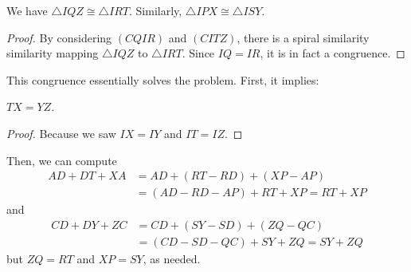 \begin{claim*}
  We have $\triangle IQZ \cong \triangle IRT$.
  Similarly, $\triangle IPX \cong \triangle ISY$.
\end{claim*}
\begin{proof}
  By considering $(CQIR)$ and $(CITZ)$,
  there is a spiral similarity similarity
  mapping $\triangle IQZ$ to $\triangle IRT$.
  Since $IQ = IR$, it is in fact a congruence.
\end{proof}

This congruence essentially solves the problem.
First, it implies:
\begin{claim*}
  $TX = YZ$.
\end{claim*}
\begin{proof}
  Because we saw $IX = IY$ and $IT = IZ$.
\end{proof}
Then, we can compute
\begin{align*}
  AD + DT + XA
  &= AD + (RT - RD) + (XP-AP) \\
  &= (AD-RD-AP) + RT + XP = RT + XP
\end{align*}
and
\begin{align*}
  CD + DY + ZC &= CD + (SY-SD) + (ZQ-QC) \\
  &= (CD-SD-QC) + SY + ZQ = SY + ZQ
\end{align*}
but $ZQ = RT$ and $XP = SY$, as needed.
\pagebreak